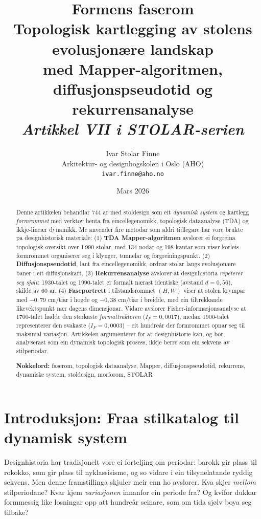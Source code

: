 \documentclass[10pt, a4paper, twocolumn]{article}
\title{%
  \textbf{Formens faserom}\\[0.3em]
  \large Topologisk kartlegging av stolens evolusjon\ae{}re landskap\\
  med Mapper-algoritmen, diffusjonspseudotid og rekurrensanalyse\\[0.5em]
  \normalsize\textit{Artikkel VII i STOLAR-serien}
}
\author{%
  Ivar Stolar Finne\\
  \small Arkitektur- og designhogskolen i Oslo (AHO)\\
  \small\texttt{ivar.finne@aho.no}
}
\date{Mars 2026}
\begin{document}
\maketitle

\begin{abstract}
\noindent
Denne artikkelen behandlar 744 ar med stoldesign som eit \emph{dynamisk system} og kartlegg \emph{formrommet} med verktoy henta fra eincellegenomikk, topologisk dataanalyse (TDA) og ikkje-line\ae{}r dynamikk. Me anvender fire metodar som aldri tidlegare har vore brukte pa designhistorisk materiale: (1) \textbf{TDA Mapper-algoritmen} avslorer ei forgrei\-na topologisk oversikt over 1\,990 stolar, med 134 nodar og 198 kantar som viser korleis formrommet organiserer seg i klynger, tunnelar og forgreiningspunkt. (2) \textbf{Diffusjonspseudotid}, lant fra eincellegenomikk, ordnar stolar langs evolusjon\ae{}re baner i eit diffusjonskart. (3) \textbf{Rekurrensanalyse} avslorer at designhistoria \emph{repeterer seg sj\o{}lv}: 1930-talet og 1990-talet er formalt n\ae{}rast identiske (avstand $d = 0{,}56$), skilde av 60 ar. (4) \textbf{Faseportrett} i tilstandsrommet $(H, W)$ viser at stolen krympar med $-0{,}79$ cm/tiar i hogde og $-0{,}38$ cm/tiar i breidde, med ein tiltrekkande likevektspunkt n\ae{}r dagens dimensjonar. Vidare avslorer Fisher-informasjonsanalyse at 1700-talet hadde den sterkaste \emph{formattraktoren} ($I_F = 0{,}0017$), medan 1900-talet representerer den svakaste ($I_F = 0{,}0003$) -- eit hundre\aa{}r der formrommet opnar seg til maksimal variasjon. Artikkelen argumenterer for at designhistorie kan, og bor, analyserast som ein dynamisk topologisk prosess, ikkje berre som ein sekvens av stilperiodar.

\smallskip\noindent
\textbf{Nokkelord:} faserom, topologisk dataanalyse, Mapper, diffusjonspseudotid, rekurrens, dynamiske system, stoldesign, morforom, STOLAR
\end{abstract}

\section{Introduksjon: Fraa stilkatalog til dynamisk system}

Designhistoria har tradisjonelt vore ei forteljing om periodar: barokk gir plass til rokokko, som gir plass til nyklassisisme, og so vidare i ein tilsynelatande ryddig sekvens. Men denne framstillinga skjuler meir enn ho avslorer. Kva skjer \emph{mellom} stilperiodane? Kvar kjem \emph{variasjonen} innanfor ein periode fra? Og kvifor dukkar formmessig like losningar opp att hundre\aa{}r seinare, som om tida sj\o{}lv boya seg tilbake?
\end{document}
